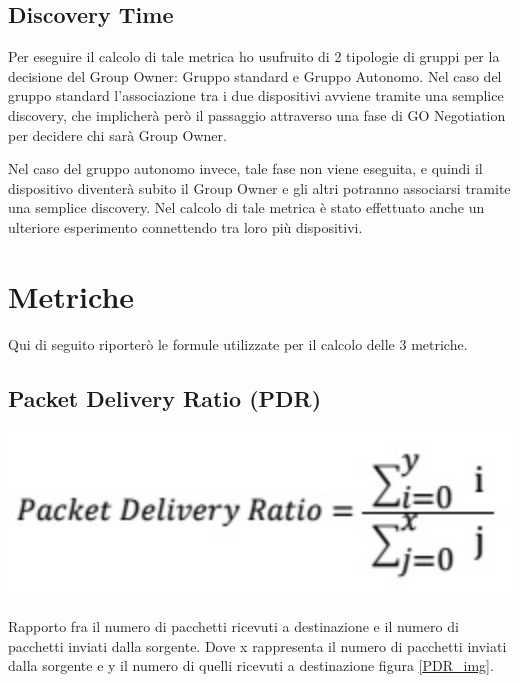 \subsection{Discovery Time}




Per eseguire il calcolo di tale metrica ho usufruito di 2 tipologie di gruppi per la decisione del Group Owner: Gruppo standard e Gruppo Autonomo.
Nel caso del gruppo standard l'associazione tra i due dispositivi avviene tramite una semplice discovery, che implicherà però il passaggio attraverso una fase di GO Negotiation per decidere chi sarà Group Owner.





Nel caso del gruppo autonomo invece, tale fase non viene eseguita, e quindi il dispositivo diventerà subito il Group Owner e gli altri potranno associarsi tramite una semplice discovery.
Nel calcolo di tale metrica è stato effettuato anche un ulteriore esperimento connettendo tra loro più dispositivi.


\section{Metriche}
Qui di seguito riporterò le formule utilizzate per il calcolo delle 3 metriche.

\subsection{Packet Delivery Ratio (PDR)}
\begin{center}
\includegraphics[width=1\textwidth]{imgs/PDR.jpg}
\label{PDR_img}%
\end{center}

Rapporto fra il numero di pacchetti ricevuti a destinazione e il numero di pacchetti inviati dalla sorgente.
Dove x rappresenta il numero di pacchetti inviati dalla sorgente e y il numero di quelli ricevuti a destinazione figura \ref{PDR_img}. 

